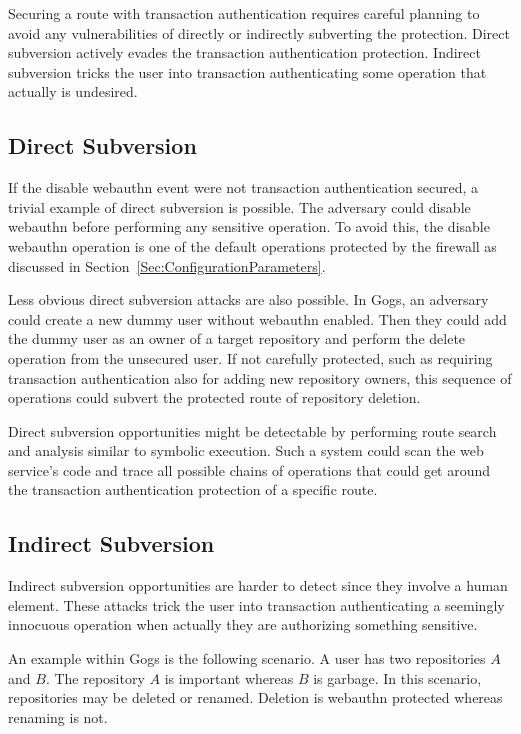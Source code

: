 
Securing a route with transaction authentication requires careful planning to avoid any vulnerabilities of directly or indirectly subverting the protection. Direct subversion actively evades the transaction authentication protection. Indirect subversion tricks the user into transaction authenticating some operation that actually is undesired.

\subsection{Direct Subversion}
If the disable webauthn event were not transaction authentication secured, a trivial example of direct subversion is possible. The adversary could disable webauthn before performing any sensitive operation. To avoid this, the disable webauthn operation is one of the default operations protected by the firewall as discussed in Section~\ref{Sec:ConfigurationParameters}.


Less obvious direct subversion attacks are also possible. In Gogs, an adversary could create a new dummy user without webauthn enabled. Then they could add the dummy user as an owner of a target repository and perform the delete operation from the unsecured user. If not carefully protected, such as requiring transaction authentication also for adding new repository owners, this sequence of operations could subvert the protected route of repository deletion.

Direct subversion opportunities might be detectable by performing route search and analysis similar to symbolic execution. Such a system could scan the web service's code and trace all possible chains of operations that could get around the transaction authentication protection of a specific route.

\subsection{Indirect Subversion}
Indirect subversion opportunities are harder to detect since they involve a human element. These attacks trick the user into transaction authenticating a seemingly innocuous operation when actually they are authorizing something sensitive. 

An example within Gogs is the following scenario. A user has two repositories $A$ and $B$. The repository $A$ is important whereas $B$ is garbage. In this scenario, repositories may be deleted or renamed. Deletion is webauthn protected whereas renaming is not.

